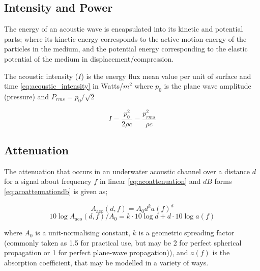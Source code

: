 \subsection{Intensity and Power} 

The energy of an acoustic wave is encapsulated into its kinetic and potential parts; where its kinetic energy corresponds to the active motion energy of the particles in the medium, and the potential energy corresponding to the elastic potential of the medium in displacement/compression.

The acoustic intensity ($I$) is the energy flux mean value per unit of surface and time \eqref{eq:acoustic_intensity} in Watts/$m^2$ where $p_0$ is the plane wave amplitude (pressure) and $P_{rms} = p_0/\sqrt{2}$

\begin{equation}
  I = \frac{p_0^2}{2\rho c} = \frac{p_{rms}^2}{\rho c}
  \label{eq:acoustic_intensity}
\end{equation}

\subsection{Attenuation}

The attenuation that occurs in an underwater acoustic channel over a distance $d$ for a signal about frequency $f$ in linear \eqref{eq:acoattenuation} and $dB$ forms \eqref{eq:acoattenuationdb} is given as;

\begin{equation}
  \label{eq:acoattenuation}
  A_{\text{aco}}(d,f) = A_0d^ka(f)^d
\end{equation}
\begin{equation}
  \label{eq:acoattenuationdb}
  10 \log A_{\text{aco}}(d,f)/A_0 = k \cdot 10 \log d + d \cdot 10 \log a(f)
\end{equation}

where $A_0$ is a unit-normalising constant, $k$ is a geometric spreading factor (commonly taken as 1.5 for practical use, but may be 2 for perfect spherical propagation or 1 for perfect plane-wave propagation)), and $a(f)$ is the absorption coefficient, that may be modelled in a variety of ways.

